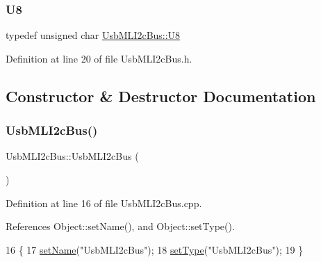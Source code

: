 \mbox{\label{classUsbMLI2cBus_a004c20fbfe08e01759f9f90806cb931e}} 
\subsubsection{\texorpdfstring{U8}{U8}}
{\footnotesize\ttfamily typedef unsigned char \hyperlink{classUsbMLI2cBus_a004c20fbfe08e01759f9f90806cb931e}{Usb\+M\+L\+I2c\+Bus\+::\+U8}}



Definition at line 20 of file Usb\+M\+L\+I2c\+Bus.\+h.



\subsection{Constructor \& Destructor Documentation}
\mbox{\label{classUsbMLI2cBus_a52646a22854d42a44810c5a976d08895}} 
\subsubsection{\texorpdfstring{Usb\+M\+L\+I2c\+Bus()}{UsbMLI2cBus()}}
{\footnotesize\ttfamily Usb\+M\+L\+I2c\+Bus\+::\+Usb\+M\+L\+I2c\+Bus (\begin{DoxyParamCaption}{ }\end{DoxyParamCaption})}



Definition at line 16 of file Usb\+M\+L\+I2c\+Bus.\+cpp.



References Object\+::set\+Name(), and Object\+::set\+Type().


\begin{DoxyCode}
16                            \{
17   \hyperlink{classObject_ae30fea75683c2d149b6b6d17c09ecd0c}{setName}(\textcolor{stringliteral}{"UsbMLI2cBus"});
18   \hyperlink{classObject_aae534cc9d982bcb9b99fd505f2e103a5}{setType}(\textcolor{stringliteral}{"UsbMLI2cBus"});
19   \}
\end{DoxyCode}
\mbox{\label{classUsbMLI2cBus_a4c6a7984e2401b48b3da785affc4d8be}} 
